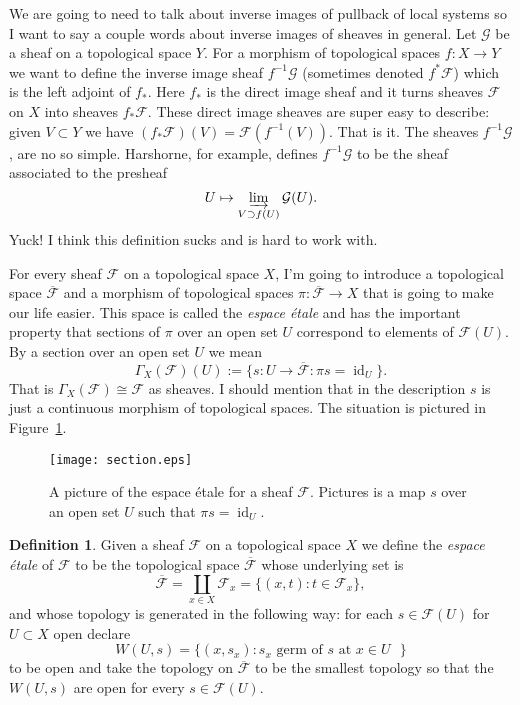 \documentclass[12pt]{book}
\numberwithin{equation}{section}
\theoremstyle{definition}
\newtheorem{definition}[theorem]{Definition}
\theoremstyle{remark}
\newcommand{\Fcal}{\mathcal{F}}
\newcommand{\Gcal}{\mathcal{G}}
\newcommand{\id}{\operatorname{id}}
\begin{document}
We are going to need to talk about inverse images of pullback of local systems so I want to say a couple words about inverse images of sheaves in general. 
Let $\Gcal$ be a sheaf on a topological space $Y$. 
For a morphism of topological spaces $f:X\to Y$ we want to define the inverse image sheaf $f^{-1}\Gcal$ (sometimes denoted $f^*\Fcal$) which is the left adjoint of $f_*$. 
Here $f_*$ is the direct image sheaf and it turns sheaves $\Fcal$ on $X$ into sheaves $f_*\Fcal$. 
These direct image sheaves are super easy to describe: given $V \subset Y$ we have $(f_*\Fcal)(V) = \Fcal(f^{-1}(V))$. 
That is it.
The sheaves $f^{-1}\Gcal$, are no so simple. 
Harshorne, for example, defines $f^{-1}\Gcal$ to be the sheaf associated to the presheaf
$$ U\mapsto \varinjlim_{V\supset f(U)} \Gcal(U). $$
Yuck! I think this definition sucks and is hard to work with. 

For every sheaf $\Fcal$ on a topological space $X$, I'm going to introduce a topological space $\overline{\Fcal}$ and a morphism of topological spaces $\pi: \overline{\Fcal} \to X$ that is going to make our life easier. 
This space is called the \emph{espace \'etale} and has the important property that sections of $\pi$ over an open set $U$ correspond to elements of $\Fcal(U)$.
By a section over an open set $U$ we mean 
$$ \Gamma_X(\mathcal{F})(U) :=\lbrace s: U \to \overline{\Fcal} \colon \pi s = \id_U \rbrace. $$
That is $\Gamma_X(\mathcal{F}) \cong \Fcal$ as sheaves. 
I should mention that in the description $s$ is just a continuous morphism of topological spaces. 
The situation is pictured in Figure~\ref{F:section}.
\begin{figure}[h]\label{F:section}
	\begin{center}
		\texttt{[image: section.eps]}
	\end{center}
	\caption{A picture of the espace \'etale for a sheaf $\mathcal{F}$. 
		Pictures is a map $s$ over an open set $U$ such that $\pi s=\id_U$.}
\end{figure}

\begin{definition}
	Given a sheaf $\Fcal$ on a topological space $X$ we define the \emph{espace \'etale} of $\Fcal$ to be the topological space $\overline{\Fcal}$ whose underlying set is 
	$$ \overline{\Fcal} = \coprod_{x\in X} \Fcal_x = \lbrace (x,t) \colon t\in \Fcal_x \rbrace, $$ 
	and whose topology is generated in the following way: for each $s \in \Fcal(U)$ for $U\subset X$ open declare
	$$ W(U, s) = \lbrace  (x,s_x) \colon s_x \mbox{ germ of $s$ at $x\in U$ }\rbrace $$
	to be open and take the topology on $\overline{\Fcal}$ to be the smallest topology so that the $W(U,s)$ are open for every $s\in \Fcal(U)$. 
\end{definition}
\end{document}
